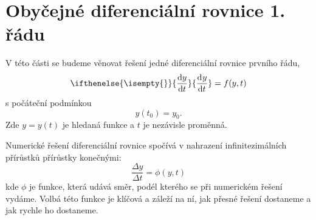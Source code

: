 \documentclass[a4paper,11pt,twoside]{article}
\renewcommand{\d}{\mathrm{d}}
\newcommand{\derivative}[3][]{\ifthenelse{\isempty{#1}}	    %
	{\frac{\d{#2}}{\d{#3}}}
	{\frac{\d^{#1}{#2}}{\d{#3}^{#1}}}
}
\theoremstyle{red}
\theoremstyle{green}
\begin{document}
\section{Obyčejné diferenciální rovnice 1. řádu}
\label{sec:ODR1}
    V této části se budeme věnovat řešení jedné diferenciální rovnice prvního řádu,
    \begin{equation}
        \derivative{y}{t}=f(y,t)
    \end{equation}
    s počáteční podmínkou
    \begin{equation}
        y(t_{0})=y_{0}.
    \end{equation}
    Zde $y=y(t)$ je hledaná funkce a $t$ je nezávisle proměnná.
    
    Numerické řešení diferenciální rovnice spočívá v nahrazení infinitezimálních přírůstků přírůstky konečnými:
    \begin{equation}\label{eq:Diference}
        \frac{\Delta y}{\Delta t}=\phi(y,t)
    \end{equation}
    kde $\phi$ je funkce, která udává směr, podél kterého se při numerickém řešení vydáme.
    Volbá této funkce je klíčová a záleží na ní, jak přesné řešení dostaneme a jak rychle ho dostaneme.
\end{document}
